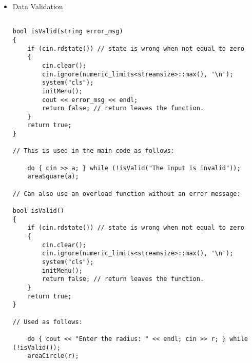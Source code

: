 \documentclass{article}
\begin{document}
\begin{itemize}

\item{Data Validation}
\begin{lstlisting}
	
bool isValid(string error_msg)
{
	if (cin.rdstate()) // state is wrong when not equal to zero
	{
		cin.clear();
		cin.ignore(numeric_limits<streamsize>::max(), '\n');
		system("cls");
		initMenu();
		cout << error_msg << endl;
		return false; // return leaves the function.
	}
	return true;
}

// This is used in the main code as follows:

	do { cin >> a; } while (!isValid("The input is invalid"));
	areaSquare(a);

// Can also use an overload function without an error message:

bool isValid()
{
	if (cin.rdstate()) // state is wrong when not equal to zero
	{
		cin.clear();
		cin.ignore(numeric_limits<streamsize>::max(), '\n');
		system("cls");
		initMenu();
		return false; // return leaves the function.
	}
	return true;
}

// Used as follows:

	do { cout << "Enter the radius: " << endl; cin >> r; } while (!isValid());
	areaCircle(r);

\end{lstlisting}



\begin{lstlisting}

\end{lstlisting}

\begin{lstlisting}

\end{lstlisting}

\begin{lstlisting}

\end{lstlisting}

\begin{lstlisting}

\end{lstlisting}



\end{itemize}
\end{document}
